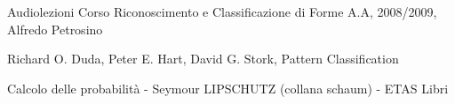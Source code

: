 %
%

%
% 
% 
%
\begin{thebibliography}{99.}
%
%
%

 Audiolezioni Corso Riconoscimento e Classificazione di Forme A.A, 2008/2009, Alfredo Petrosino

  Richard O. Duda, Peter E. Hart, David G. Stork, Pattern Classification

  Calcolo delle probabilità - Seymour LIPSCHUTZ (collana schaum) - ETAS Libri


%
%
%

\end{thebibliography}
